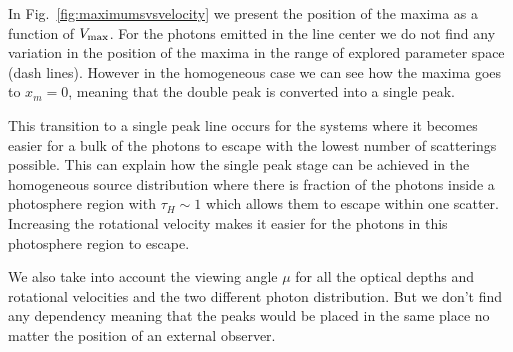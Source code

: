 \documentclass[usenatbib]{mn2e}
\newcommand{\kms}{\,km~s$^{-1}$}
\begin{document}
In Fig.~\ref{fig:maximumsvsvelocity} we present the position
of the maxima as a function of $V_{\rm max}$. For the photons emitted
in the line center we do not find any variation in the position of the
maxima in the range of explored parameter space (dash lines). However in the
homogeneous case we can see how the maxima goes to $x_{m}=0$, meaning
that the double peak is converted into a single peak.

This transition to a single peak line occurs for the systems where it
becomes easier for a bulk of the photons to escape with the lowest
number of scatterings possible. This can explain how the single peak
stage can be achieved in the homogeneous source distribution where
there is fraction of the photons inside a photosphere region with
$\tau_{H}\sim 1$ which allows them to escape within one
scatter. Increasing the rotational velocity makes it easier for the
photons in this photosphere region to escape.

We also take into account the viewing angle $\mu$ for all the optical 
depths and rotational velocities and the two different photon distribution.
But we don't find any dependency meaning that the peaks would be placed in
the same place no matter the position of an external observer.	






\end{document}
